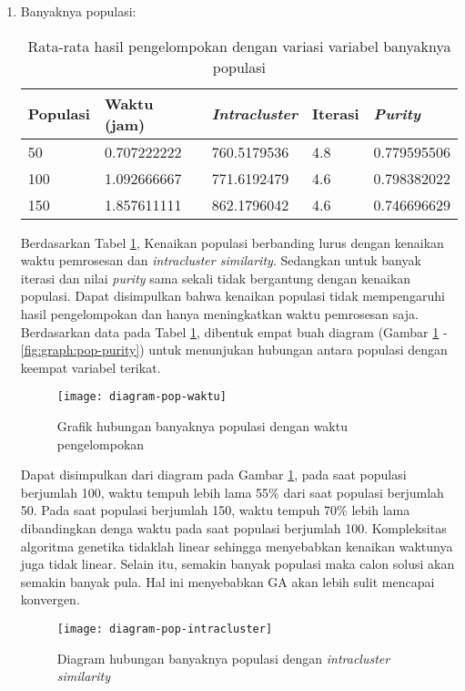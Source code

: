 \begin{enumerate}
	\item Banyaknya populasi:
		\begin{table}[H]
			\centering
			\caption{Rata-rata hasil pengelompokan dengan variasi variabel banyaknya populasi}
			\begin{tabular}{|l|l|l|l|l|} \hline
				Populasi & Waktu (jam) & \textit{Intracluster} & Iterasi& \textit{Purity} \\ \hline
				50  & 0.707222222 & 760.5179536 & 4.8 & 0.779595506 \\ \hline
				100 & 1.092666667 & 771.6192479 & 4.6 & 0.798382022 \\ \hline
				150 & 1.857611111 & 862.1796042 & 4.6 & 0.746696629 \\ \hline
			\end{tabular}
			\label{tbl:exp-pop}
		\end{table}
		
		Berdasarkan Tabel \ref{tbl:exp-pop}, Kenaikan populasi berbanding lurus dengan kenaikan waktu pemrosesan dan \textit{intracluster similarity}. Sedangkan untuk banyak iterasi dan nilai \textit{purity} sama sekali tidak bergantung dengan kenaikan populasi. Dapat disimpulkan bahwa kenaikan populasi tidak mempengaruhi hasil pengelompokan dan hanya meningkatkan waktu pemrosesan saja. Berdasarkan data pada Tabel \ref{tbl:exp-pop}, dibentuk empat buah diagram (Gambar \ref{fig:graph:pop-time} - \ref{fig:graph:pop-purity}) untuk menunjukan hubungan antara populasi dengan keempat variabel terikat.
		
		\begin{figure}[H]
			\centering
			\texttt{[image: diagram-pop-waktu]}
			\caption{Grafik hubungan banyaknya populasi dengan waktu pengelompokan}
			\label{fig:graph:pop-time}
		\end{figure}
		
		Dapat disimpulkan dari diagram pada Gambar \ref{fig:graph:pop-time}, pada saat populasi berjumlah 100, waktu tempuh lebih lama 55\% dari saat populasi berjumlah 50. Pada saat populasi berjumlah 150, waktu tempuh 70\% lebih lama dibandingkan denga waktu pada saat populasi berjumlah 100. Kompleksitas algoritma genetika tidaklah linear sehingga menyebabkan kenaikan waktunya juga tidak linear. Selain itu, semakin banyak populasi maka calon solusi akan semakin banyak pula. Hal ini menyebabkan GA akan lebih sulit mencapai konvergen.
		
		\begin{figure}[H]
			\centering
			\texttt{[image: diagram-pop-intracluster]}
			\caption{Diagram hubungan banyaknya populasi dengan \textit{intracluster similarity}}
			\label{fig:graph:pop-intra}
		\end{figure}
		

\end{enumerate}
